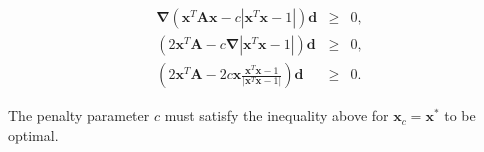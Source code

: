 \documentclass{article}
\begin{document}
\begin{enumerate}
\begin{enumerate}[a)]
		\begin{eqnarray*}
		\boldsymbol{\nabla}\left(\mathbf{x}^T\mathbf{A}\mathbf{x} - c|\mathbf{x}^T\mathbf{x} - 1|\right)\mathbf{d} &\ge& 0,\\
		\left(2\mathbf{x}^T\mathbf{A} - c\boldsymbol{\nabla}|\mathbf{x}^T\mathbf{x} - 1|\right)\mathbf{d} &\ge& 0,\\
		\left(2\mathbf{x}^T\mathbf{A} - 2c\mathbf{x}\frac{\mathbf{x}^T\mathbf{x} - 1}{|\mathbf{x}^T\mathbf{x} - 1|}\right)\mathbf{d} &\ge& 0.
		\end{eqnarray*}
		
		The penalty parameter $c$ must satisfy the inequality above for $\mathbf{x}_c = \mathbf{x}^*$ to be optimal.
		
	\end{enumerate}
	
\end{enumerate}
\end{document}
